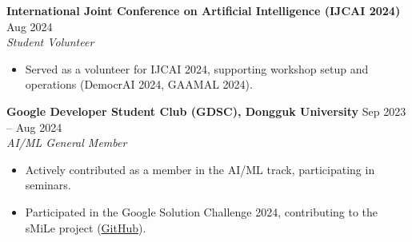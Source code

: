 \documentclass[10pt,letterpaper]{article}
\newcommand{\cvheader}[1]{{\normalsize\bfseries #1}}
\newcommand{\cvposition}[1]{{\itshape #1}}
\newcommand{\cvdate}[1]{\hfill #1}
\begin{document}
\vspace{1pt}
\cvheader{International Joint Conference on Artificial Intelligence (IJCAI 2024)} \cvdate{Aug 2024}\\
\cvposition{Student Volunteer}
\begin{itemize}
    \item Served as a volunteer for IJCAI 2024, supporting workshop setup and operations (DemocrAI 2024, GAAMAL 2024).
\end{itemize}

\vspace{1pt}
\cvheader{Google Developer Student Club (GDSC), Dongguk University} \cvdate{Sep 2023 -- Aug 2024}\\
\cvposition{AI/ML General Member}
\begin{itemize}
    \item Actively contributed as a member in the AI/ML track, participating in seminars.
    \item Participated in the Google Solution Challenge 2024, contributing to the sMiLe project (\href{https://github.com/bk123477/2024-SolutionChallenge-sMiLe}{GitHub}).
\end{itemize}
\end{document}
